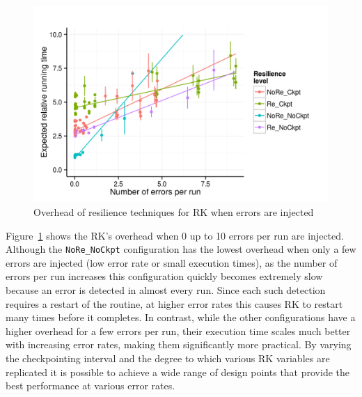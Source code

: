 \documentclass{sig-alternate}
\begin{document}


\begin{figure}[ht!]
\centering
\includegraphics[width=1.00\columnwidth]{figs/4_1_2_Exp2_Expected_Running_Time_Needed.png}
\caption{Overhead of resilience techniques for RK when errors are injected}
\label{fig:rk_routine_exp_exec}
\end{figure}

Figure~\ref{fig:rk_routine_exp_exec} shows the RK's overhead when 0 up to 10 errors per run are injected.%
Although the \texttt{NoRe\_NoCkpt} configuration has the lowest overhead when only a few errors are injected (low error rate or small execution times), as the number of errors per run increases this configuration quickly becomes extremely slow because an error is detected in almost every run.
Since each such detection requires a restart of the routine, at higher error rates this causes RK to restart many times before it completes.
In contrast, while the other configurations have a higher overhead for a few errors per run, their execution time scales much better with increasing error rates, making them significantly more practical.
By varying the checkpointing interval and the degree to which various RK variables are replicated it is possible to achieve a wide range of design points that provide the best performance at various error rates.
\end{document}
